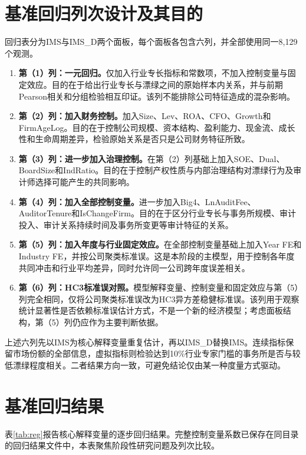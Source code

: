 \documentclass[UTF8,12pt,a4paper]{ctexart}
\begin{document}
\section{基准回归列次设计及其目的}

回归表分为IMS与IMS\_D两个面板，每个面板各包含六列，并全部使用同一8,129个观测。

\begin{enumerate}
  \item \textbf{第（1）列：一元回归。}仅加入行业专长指标和常数项，不加入控制变量与固定效应。目的在于给出行业专长与漂绿之间的原始样本内关系，并与前期Pearson相关和分组检验相互印证。该列不能排除公司特征造成的混杂影响。
  \item \textbf{第（2）列：加入财务控制。}加入Size、Lev、ROA、CFO、Growth和FirmAgeLog。目的在于控制公司规模、资本结构、盈利能力、现金流、成长性和生命周期差异，检验原始关系是否只是公司财务特征所致。
  \item \textbf{第（3）列：进一步加入治理控制。}在第（2）列基础上加入SOE、Dual、BoardSize和IndRatio。目的在于控制产权性质与内部治理结构对漂绿行为及审计师选择可能产生的共同影响。
  \item \textbf{第（4）列：加入全部控制变量。}进一步加入Big4、LnAuditFee、AuditorTenure和IsChangeFirm。目的在于区分行业专长与事务所规模、审计投入、审计关系持续时间及事务所变更等审计特征的关系。
  \item \textbf{第（5）列：加入年度与行业固定效应。}在全部控制变量基础上加入Year FE和Industry FE，并按公司聚类标准误。这是本阶段的主模型，用于控制各年度共同冲击和行业平均差异，同时允许同一公司跨年度误差相关。
  \item \textbf{第（6）列：HC3标准误对照。}模型解释变量、控制变量和固定效应与第（5）列完全相同，仅将公司聚类标准误改为HC3异方差稳健标准误。该列用于观察统计显著性是否依赖标准误估计方式，不是一个新的经济模型；考虑面板结构，第（5）列仍应作为主要判断依据。
\end{enumerate}

上述六列先以IMS为核心解释变量重复估计，再以IMS\_D替换IMS。连续指标保留市场份额的全部信息，虚拟指标则检验达到10\%行业专家门槛的事务所是否与较低漂绿程度相关。二者结果方向一致，可避免结论仅由某一种度量方式驱动。

\section{基准回归结果}

表\ref{tab:reg}报告核心解释变量的逐步回归结果。完整控制变量系数已保存在同目录的回归结果文件中，本表聚焦阶段性研究问题及列次比较。
\end{document}

